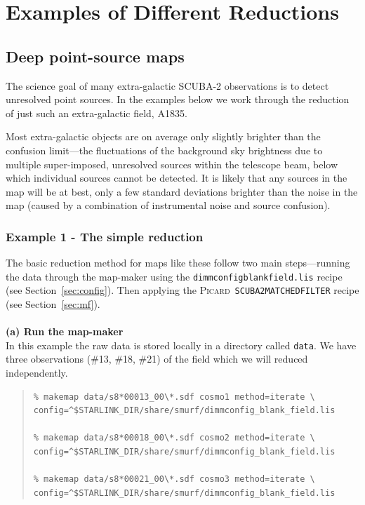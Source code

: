\documentclass[twoside,11pt]{article}
\newcommand{\htmlref}[2]{#1}
\newcommand{\latexhtml}[2]{#1}
\newcommand{\xref}[3]{#1}
\newcommand{\xlabel}[1]{}
\renewcommand{\_}{\texttt{\symbol{95}}}
\newenvironment{myquote}{\begin{quote}\begin{small}}{\end{small}\end{quote}}
\newcommand{\picard}{\xref{\textsc{Picard}}{sun265}{}}
\newcommand{\drrecipe}[1]{\texttt{#1}}
\newcommand{\cref}[3]{\latexhtml{#1~\ref{#2}}{\htmlref{#3}{#2}}}
\begin{document}
\clearpage
\section{\xlabel{Examples}Examples of Different Reductions}
\label{sec:eg}

\subsection{\xlabel{Cosmology}Deep point-source maps}
\label{sec:cosmology}

The science goal of many extra-galactic SCUBA-2 observations is to
detect unresolved point sources. In the examples below we work through the
reduction of just such an extra-galactic field, A1835.

Most extra-galactic objects are on average only slightly brighter than
the confusion limit---the fluctuations of the background sky
brightness due to multiple super-imposed, unresolved sources within
the telescope beam, below which individual sources cannot be detected.
It is likely that any sources in the map will be at best, only a few
standard deviations brighter than the noise in the map (caused by a
combination of instrumental noise and source confusion).

\subsubsection{Example 1 - The simple reduction}
The basic reduction method for maps like these follow two main
steps---running the data through the map-maker using the
\texttt{dimmconfig\_blank\_field.lis} recipe (see
\cref{Section}{sec:config}{Specialised configuration files}). Then
applying the \picard\ \drrecipe{SCUBA2\_MATCHED\_FILTER} recipe (see
\cref{Section}{sec:mf}{Point-source extraction}).
\\ \\
\textbf{(a) Run the map-maker}\\
In this example the raw data is stored locally in a directory called
\texttt{data}. We have three observations (\#13, \#18, \#21) of the field
which we will reduced independently.

\begin{myquote}
\begin{verbatim}
% makemap data/s8*00013_00\*.sdf cosmo1 method=iterate \
config=^$STARLINK_DIR/share/smurf/dimmconfig_blank_field.lis

% makemap data/s8*00018_00\*.sdf cosmo2 method=iterate \
config=^$STARLINK_DIR/share/smurf/dimmconfig_blank_field.lis

% makemap data/s8*00021_00\*.sdf cosmo3 method=iterate \
config=^$STARLINK_DIR/share/smurf/dimmconfig_blank_field.lis

\end{verbatim}
\end{myquote}
\end{document}
